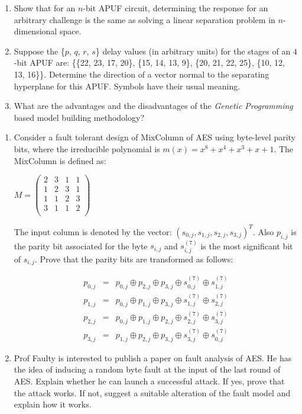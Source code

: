 \documentclass{article}
\begin{document}
\begin{questions}
 


\question
\begin{enumerate}
\item Show that for an $n$-bit APUF circuit, determining the response for an
arbitrary challenge is the same as solving a linear separation problem in
$n$-dimensional space. 
\item Suppose the \{$p$, $q$, $r$, $s$\} delay values (in arbitrary units) 
for the stages of an $4$-bit APUF are: \{\{22, 23, 17, 20\}, \{15, 14, 13, 9\}, 
\{20, 21, 22, 25\}, \{10, 12, 13, 16\}\}. Determine the direction
of a vector normal to the separating hyperplane for this APUF. Symbols
have their usual meaning. 
\item What are the advantages and the disadvantages of the \emph{Genetic Programming}
based model building methodology? 
\end{enumerate}

\question 
\begin{enumerate}
\item Consider a fault tolerant design of MixColumn of AES using byte-level parity bits, where the irreducible polynomial is 
$m(x)=x^8+x^4+x^3+x+1$. The MixColumn is defined as:
\begin{center}  
$M=\begin{pmatrix}
    2  &  3 & 1 & 1\\
    1  &  2 & 3 & 1\\
    1  &  1 & 2 & 3\\
    3 & 1 & 1 & 2\\
  \end{pmatrix}$
\end{center}
The input column is denoted by the vector: $(s_{0,j},s_{1,j},s_{2,j},s_{3,j})^T$. Also $p_{i,j}$ is the parity bit associated for the byte $s_{i,j}$ and $s_{i,j}^{(7)}$ is the most significant bit of $s_{i,j}$. Prove that the parity bits are transformed as follows:

\begin{eqnarray*}
p_{0,j} &=& p_{0,j} \oplus p_{2,j} \oplus p_{3,j} \oplus s_{0,j}^{(7)} \oplus 
s_{1,j}^{(7)}\\ 
p_{1,j} &=& p_{0,j} \oplus p_{1,j} \oplus p_{3,j} \oplus s_{1,j}^{(7)} \oplus 
s_{2,j}^{(7)}\\
p_{2,j} &=& p_{0,j} \oplus p_{1,j} \oplus p_{2,j} \oplus s_{2,j}^{(7)} \oplus 
s_{3,j}^{(7)}\\
p_{3,j} &=& p_{1,j} \oplus p_{2,j} \oplus p_{3,j} \oplus s_{3,j}^{(7)} \oplus s_{0,j}^{(7)}
\end{eqnarray*}

\item Prof Faulty is interested to publish a paper on fault analysis of AES. He has the idea of inducing a random byte fault at the input of the last round of AES. Explain whether he can launch a successful attack. If yes, prove that the attack works. If not, suggest a suitable alteration of the fault model and explain how it works.
\end{enumerate}

\end{questions}
\end{document}
